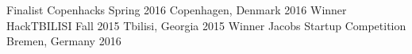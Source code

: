 \begin{cvhonors}
  \cvhonor
    {Finalist} %
    {Copenhacks Spring 2016} %
    {Copenhagen, Denmark} %
    {2016} %
  \cvhonor
    {Winner} %
    {HackTBILISI Fall 2015} %
    {Tbilisi, Georgia} %
    {2015} %
  \cvhonor
    {Winner} %
    {Jacobs Startup Competition} %
    {Bremen, Germany} %
    {2016} %
\end{cvhonors}